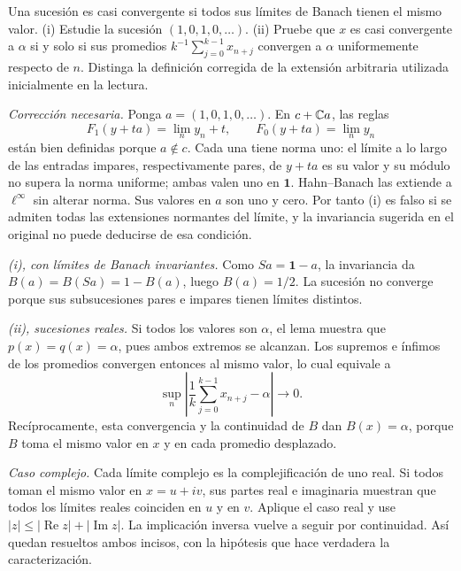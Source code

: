 \begin{ejercicio}\label{ej:v3-l01-5}
Una sucesión es casi convergente si todos sus límites de Banach tienen el mismo valor. (i) Estudie la sucesión $(1,0,1,0,\ldots)$. (ii) Pruebe que $x$ es casi convergente a $\alpha$ si y solo si sus promedios $k^{-1}\sum_{j=0}^{k-1}x_{n+j}$ convergen a $\alpha$ uniformemente respecto de $n$. Distinga la definición corregida de la extensión arbitraria utilizada inicialmente en la lectura.
\end{ejercicio}
\begin{solucion}
\emph{Corrección necesaria.} Ponga $a=(1,0,1,0,\ldots)$. En $c+\mathbb C a$, las reglas
\[
 F_1(y+ta)=\lim_ny_n+t,\qquad F_0(y+ta)=\lim_ny_n
\]
están bien definidas porque $a\notin c$. Cada una tiene norma uno: el límite a lo largo de las entradas impares, respectivamente pares, de $y+ta$ es su valor y su módulo no supera la norma uniforme; ambas valen uno en $\mathbf1$. Hahn--Banach las extiende a $\ell^\infty$ sin alterar norma. Sus valores en $a$ son uno y cero. Por tanto (i) es falso si se admiten todas las extensiones normantes del límite, y la invariancia sugerida en el original no puede deducirse de esa condición.

\emph{(i), con límites de Banach invariantes.} Como $Sa=\mathbf1-a$, la invariancia da $B(a)=B(Sa)=1-B(a)$, luego $B(a)=1/2$. La sucesión no converge porque sus subsucesiones pares e impares tienen límites distintos.

\emph{(ii), sucesiones reales.} Si todos los valores son $\alpha$, el lema muestra que $p(x)=q(x)=\alpha$, pues ambos extremos se alcanzan. Los supremos e ínfimos de los promedios convergen entonces al mismo valor, lo cual equivale a
\[
 \sup_n\left|\frac1k\sum_{j=0}^{k-1}x_{n+j}-\alpha\right|\longrightarrow0.
\]
Recíprocamente, esta convergencia y la continuidad de $B$ dan $B(x)=\alpha$, porque $B$ toma el mismo valor en $x$ y en cada promedio desplazado.

\emph{Caso complejo.} Cada límite complejo es la complejificación de uno real. Si todos toman el mismo valor en $x=u+iv$, sus partes real e imaginaria muestran que todos los límites reales coinciden en $u$ y en $v$. Aplique el caso real y use $|z|\leq|\operatorname{Re}z|+|\operatorname{Im}z|$. La implicación inversa vuelve a seguir por continuidad. Así quedan resueltos ambos incisos, con la hipótesis que hace verdadera la caracterización.
\end{solucion}


